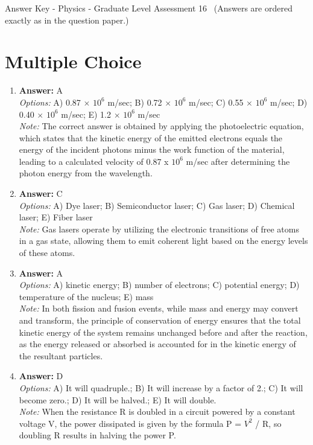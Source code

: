 \documentclass[12pt]{article}
\begin{document}
\begin{center}
Answer Key - Physics - Graduate Level Assessment 16 \
\small (Answers are ordered exactly as in the question paper.)
\end{center}

\section*{Multiple Choice}
\begin{enumerate}[label=\arabic*.]
\item \textbf{Answer:} A
\\ \textit{Options:} A) 0.87 \ensuremath{\times} $10^6$ m/sec; B) 0.72 \ensuremath{\times} $10^6$ m/sec; C) 0.55 \ensuremath{\times} $10^6$ m/sec; D) 0.40 \ensuremath{\times} $10^6$ m/sec; E) 1.2 \ensuremath{\times} $10^6$ m/sec
\\ \textit{Note:} The correct answer is obtained by applying the photoelectric equation, which states that the kinetic energy of the emitted electrons equals the energy of the incident photons minus the work function of the material, leading to a calculated velocity of 0.87 x $10^6$ m/sec after determining the photon energy from the wavelength.
\item \textbf{Answer:} C
\\ \textit{Options:} A) Dye laser; B) Semiconductor laser; C) Gas laser; D) Chemical laser; E) Fiber laser
\\ \textit{Note:} Gas lasers operate by utilizing the electronic transitions of free atoms in a gas state, allowing them to emit coherent light based on the energy levels of these atoms.
\item \textbf{Answer:} A
\\ \textit{Options:} A) kinetic energy; B) number of electrons; C) potential energy; D) temperature of the nucleus; E) mass
\\ \textit{Note:} In both fission and fusion events, while mass and energy may convert and transform, the principle of conservation of energy ensures that the total kinetic energy of the system remains unchanged before and after the reaction, as the energy released or absorbed is accounted for in the kinetic energy of the resultant particles.
\item \textbf{Answer:} D
\\ \textit{Options:} A) It will quadruple.; B) It will increase by a factor of 2.; C) It will become zero.; D) It will be halved.; E) It will double.
\\ \textit{Note:} When the resistance R is doubled in a circuit powered by a constant voltage V, the power dissipated is given by the formula P = $V^2$ / R, so doubling R results in halving the power P.

\end{enumerate}
\end{document}
